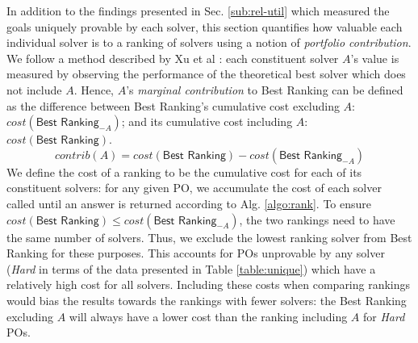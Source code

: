 \sloppypar
In addition to the findings presented in Sec. \ref{sub:rel-util} which measured the goals uniquely provable by each solver, this section quantifies how valuable each individual solver is to a ranking of solvers using a notion of \textit{portfolio contribution}.
We follow a method described by Xu et al \cite{Xu2012}: each constituent solver $A$'s value is measured by observing the performance of the theoretical best solver which does not include $A$.
Hence, $A$'s \textit{marginal contribution} to \textsf{Best Ranking} can be defined as the difference between \textsf{Best Ranking}'s cumulative cost excluding $A$: $cost(\textsf{Best Ranking}_{-A})$; and its cumulative cost including $A$: $cost(\textsf{Best Ranking})$.
\[
	contrib(A) = cost(\textsf{Best Ranking}) - cost(\textsf{Best Ranking}_{-A})
\]
We define the cost of a ranking to be the cumulative cost for each of its constituent solvers:
for any given PO, we accumulate the cost of each solver called until an answer is returned according to Alg. \ref{algo:rank}.
To ensure $cost(\textsf{Best Ranking}) \leq cost(\textsf{Best Ranking}_{-A})$, the two rankings need to have the same number of solvers. 
Thus, we exclude the lowest ranking solver from \textsf{Best Ranking} for these purposes.
This accounts for POs unprovable by any solver (\textit{Hard} in terms of the data presented in Table \ref{table:unique}) which have a relatively high cost for all solvers. 
Including these costs when comparing rankings would bias the results towards the rankings with fewer solvers: the \textsf{Best Ranking} excluding $A$ will always have a lower cost than the ranking including $A$ for \textit{Hard} POs.   

